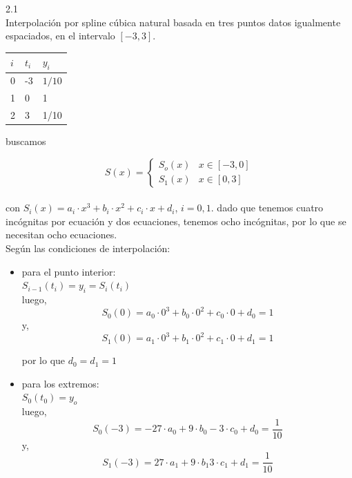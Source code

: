 \documentclass{article}
\begin{document}
2.1\\
Interpolación por spline cúbica natural basada en tres puntos datos igualmente espaciados, en el intervalo $[-3, 3]$.\\

\begin{table}[H]
\centering
\begin{tabular}{|l|l|l|}
\hline
$i$ & $t_i$ & $y_i$ \\ \hline
0 & -3   & $1/10$ \\ \hline
1 & 0    & 1    \\ \hline
2 & 3    & 1/10 \\ \hline
\end{tabular}
\end{table}

buscamos 

\[ S(x) = \begin{cases} 
      S_o(x) & x \in [-3, 0] \\
      S_1(x) & x \in [0, 3]
   \end{cases}
\]\\

con $S_i(x) = a_i \cdot x^3 + b_i \cdot x^2 + c_i \cdot x + d_i$, $i = 0, 1$.
dado que tenemos cuatro incógnitas por ecuación y dos ecuaciones, tenemos ocho incógnitas, por lo que se necesitan ocho ecuaciones.\\

Según las condiciones de interpolación:
\begin{itemize}
    \item para el punto interior:\\$S_{i-1}(t_i) = y_i = S_i(t_i)$\\
    luego, 
    \[S_0(0) = a_0 \cdot 0^3 + b_0 \cdot 0^2 + c_0 \cdot 0 + d_0 = 1\]
    y, 
    \[S_1(0) = a_1 \cdot 0^3 + b_1 \cdot 0^2 + c_1 \cdot 0 + d_1 = 1\]

    por lo que $d_0 = d_1 = 1$
    
    \item para los extremos:\\
    $S_0(t_0) = y_o$\\
    luego,
    \[S_0(-3) = -27 \cdot a_0 + 9 \cdot b_0 -3 \cdot c_0 + d_0 = \dfrac{1}{10} \]
    y,
    \[S_1(-3) = 27 \cdot a_1 + 9 \cdot b_1 3 \cdot c_1 + d_1 = \dfrac{1}{10} \]
\end{itemize}
\end{document}
